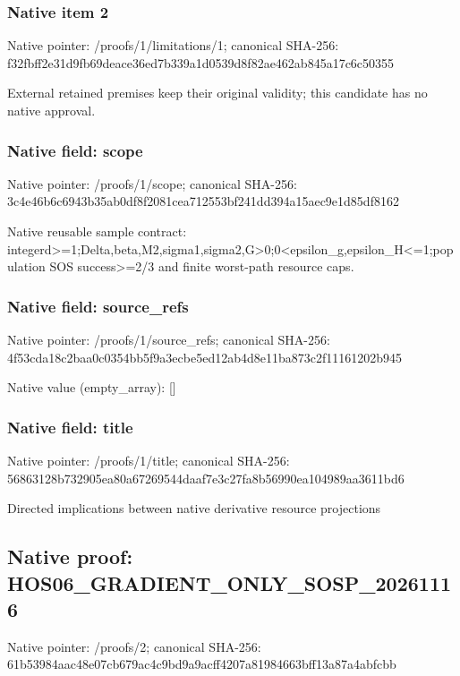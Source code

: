 \documentclass[10pt,a4paper]{article}
\begin{document}
\subsubsection{Native item 2}
Native pointer: /proofs/1/limitations/1; canonical SHA-256: f32fbff2e31d9fb69deace36ed7b339a1d0539d8f82ae462ab845a17c6c50355

\begingroup\raggedright\sloppy External retained premises keep their original validity;\allowbreak{} this candidate has no native approval.\par\endgroup

\subsubsection{Native field: scope}
Native pointer: /proofs/1/scope; canonical SHA-256: 3c4e46b6c6943b35ab0df8f2081cea712553bf241dd394a15aec9e1d85df8162

\begingroup\raggedright\sloppy Native reusable sample contract:\allowbreak{} integerd>=\allowbreak{}1;\allowbreak{}Delta,\allowbreak{}beta,\allowbreak{}M2,\allowbreak{}sigma1,\allowbreak{}sigma2,\allowbreak{}G>0;\allowbreak{}0<epsilon\_\allowbreak{}g,\allowbreak{}epsilon\_\allowbreak{}H<=\allowbreak{}1;\allowbreak{}population SOS success>=\allowbreak{}2/\allowbreak{}3 and finite worst-path resource caps.\par\endgroup

\subsubsection{Native field: source\_\allowbreak{}refs}
Native pointer: /proofs/1/source\_\allowbreak{}refs; canonical SHA-256: 4f53cda18c2baa0c0354bb5f9a3ecbe5ed12ab4d8e11ba873c2f11161202b945

Native value (empty\_\allowbreak{}array): []

\subsubsection{Native field: title}
Native pointer: /proofs/1/title; canonical SHA-256: 56863128b732905ea80a67269544daaf7e3c27fa8b56990ea104989aa3611bd6

\begingroup\raggedright\sloppy Directed implications between native derivative resource projections\par\endgroup

\subsection{Native proof: HOS06\_\allowbreak{}GRADIENT\_\allowbreak{}ONLY\_\allowbreak{}SOSP\_\allowbreak{}20261116}
Native pointer: /proofs/2; canonical SHA-256: 61b53984aac48e07cb679ac4c9bd9a9acff4207a81984663bff13a87a4abfcbb
\end{document}
